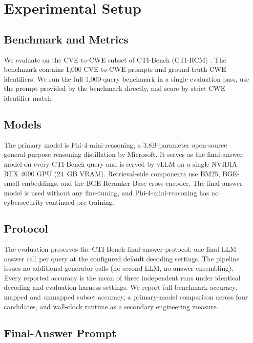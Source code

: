 \section{Experimental Setup}

\subsection{Benchmark and Metrics}

We evaluate on the CVE-to-CWE subset of CTI-Bench (CTI-RCM) \cite{alam-2024}. The benchmark contains 1{,}000 CVE-to-CWE prompts and ground-truth CWE identifiers. We run the full 1{,}000-query benchmark in a single evaluation pass, use the prompt provided by the benchmark directly, and score by strict CWE identifier match.

\subsection{Models}

The primary model is Phi-4-mini-reasoning, a 3.8B-parameter open-source general-purpose reasoning distillation by Microsoft. It serves as the final-answer model on every CTI-Bench query and is served by vLLM \cite{kwon-2023} on a single NVIDIA RTX 4090 GPU (24~GB VRAM). Retrieval-side components use BM25, BGE-small embeddings, and the BGE-Reranker-Base cross-encoder. The final-answer model is used without any fine-tuning, and Phi-4-mini-reasoning has no cybersecurity continued pre-training.

\subsection{Protocol}

The evaluation preserves the CTI-Bench final-answer protocol: one final LLM answer call per query at the configured default decoding settings. The pipeline issues no additional generator calls (no second LLM, no answer ensembling). Every reported accuracy is the mean of three independent runs under identical decoding and evaluation-harness settings. We report full-benchmark accuracy, mapped and unmapped subset accuracy, a primary-model comparison across four candidates, and wall-clock runtime as a secondary engineering measure.

\subsection{Final-Answer Prompt}
\label{sec:prompt}


